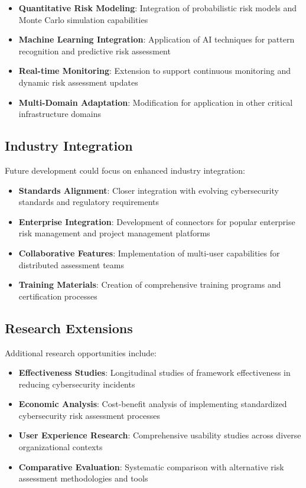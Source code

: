 \documentclass[binding=0.6cm]{sapthesis}
\begin{document}
\begin{itemize}
    \item \textbf{Quantitative Risk Modeling}: Integration of probabilistic risk models and Monte Carlo simulation capabilities
    \item \textbf{Machine Learning Integration}: Application of AI techniques for pattern recognition and predictive risk assessment
    \item \textbf{Real-time Monitoring}: Extension to support continuous monitoring and dynamic risk assessment updates
    \item \textbf{Multi-Domain Adaptation}: Modification for application in other critical infrastructure domains
\end{itemize}

\subsection{Industry Integration}

Future development could focus on enhanced industry integration:

\begin{itemize}
    \item \textbf{Standards Alignment}: Closer integration with evolving cybersecurity standards and regulatory requirements
    \item \textbf{Enterprise Integration}: Development of connectors for popular enterprise risk management and project management platforms
    \item \textbf{Collaborative Features}: Implementation of multi-user capabilities for distributed assessment teams
    \item \textbf{Training Materials}: Creation of comprehensive training programs and certification processes
\end{itemize}

\subsection{Research Extensions}

Additional research opportunities include:

\begin{itemize}
    \item \textbf{Effectiveness Studies}: Longitudinal studies of framework effectiveness in reducing cybersecurity incidents
    \item \textbf{Economic Analysis}: Cost-benefit analysis of implementing standardized cybersecurity risk assessment processes
    \item \textbf{User Experience Research}: Comprehensive usability studies across diverse organizational contexts
    \item \textbf{Comparative Evaluation}: Systematic comparison with alternative risk assessment methodologies and tools
\end{itemize}
\end{document}
